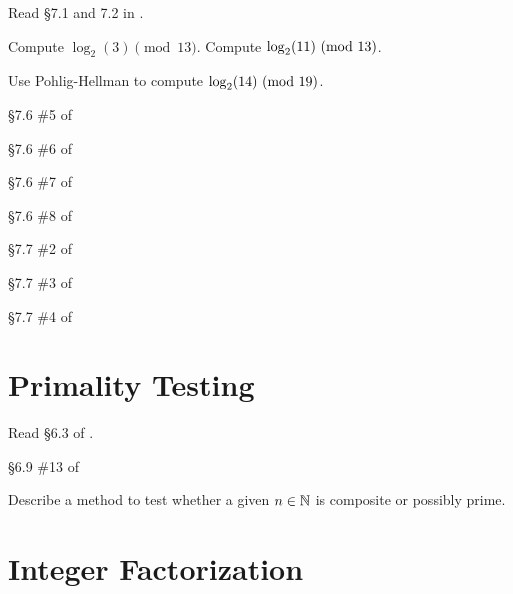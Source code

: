 Read \S 7.1 and 7.2 in \cite{tw}.

\begin{problem}[10 points]
	Compute $\log_2(3) \pmod{13}$.
	Compute $\log_2(11) \mbox{\ $\left(\mathrm{mod}\ {13}\right)$}$.
\end{problem}

\begin{problem}[10 points]
	Use Pohlig-Hellman to compute $\log_2(14) \mbox{\ $\left(\mathrm{mod}\ {19}\right)$}$.
\end{problem}

\begin{problem}[15 points]
	\S 7.6 \#5 of \cite {tw}
\end{problem}

\begin{problem}[15 points]
	\S 7.6 \#6 of \cite {tw}
\end{problem}

\begin{problem}[15 points]
	\S 7.6 \#7 of \cite {tw}
\end{problem}

\begin{problem}[10 points]
	\S 7.6 \#8 of \cite {tw}
\end{problem}

\begin{problem}[10 points]
	\S 7.7 \#2 of \cite {tw}
\end{problem}

\begin{problem}[5 points]
	\S 7.7 \#3 of \cite {tw}
\end{problem}

\begin{problem}[10 points]
	\S 7.7 \#4 of \cite {tw}
\end{problem}


	\section{Primality Testing}

Read \S6.3 of \cite{tw}.

\begin{problem}[10 points]
	\S 6.9 \#13 of \cite {tw}
\end{problem}

\begin{problem}[15 points]
	Describe a method to test whether a given $n\in\mathbb{N}$ is composite or possibly prime.
\end{problem}

	\section{Integer Factorization}

